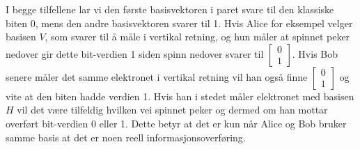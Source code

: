 I begge tilfellene lar vi den første basisvektoren i paret svare til den klassiske biten 0, mens den andre basisvektoren svarer til 1. Hvis Alice for eksempel velger basisen $V$, som svarer til å måle i vertikal retning, og hun måler at spinnet peker nedover gir dette bit-verdien 1 siden spinn nedover svarer til $\left[\begin{array}{c}0\\1\end{array}\right]$. Hvis Bob senere måler det samme elektronet i vertikal retning vil han også finne $\left[\begin{array}{c}0\\1\end{array}\right]$ og vite at den biten hadde verdien 1. Hvis han i stedet måler elektronet med basisen $H$ vil det være tilfeldig hvilken vei spinnet peker og dermed om han mottar overført bit-verdien 0 eller 1. Dette betyr at det er kun når Alice og Bob bruker samme basis at det er noen reell informasjonsoverføring.

